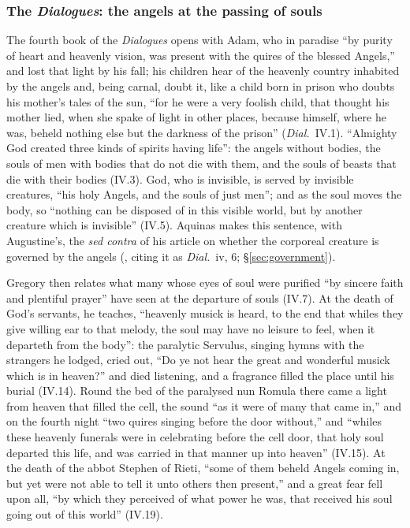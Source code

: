 \subsubsection{The \emph{Dialogues}: the angels at the passing of souls}

The fourth book of the \emph{Dialogues} opens with Adam, who in paradise ``by
purity of heart and heavenly vision, was present with the quires of the
blessed Angels,'' and lost that light by his fall; his children hear of the
heavenly country inhabited by the angels and, being carnal, doubt it, like a
child born in prison who doubts his mother's tales of the sun, ``for he were
a very foolish child, that thought his mother lied, when she spake of light in
other places, because himself, where he was, beheld nothing else but the
darkness of the prison'' (\emph{Dial.}\ IV.1). ``Almighty God
created three kinds of spirits having life'': the angels without bodies, the
souls of men with bodies that do not die with them, and the souls of beasts
that die with their bodies (IV.3). God, who is invisible, is served by
invisible creatures, ``his holy Angels, and the souls of just men''; and as
the soul moves the body, so ``nothing can be disposed of in this visible
world, but by another creature which is invisible'' (IV.5). Aquinas makes
this sentence, with Augustine's, the \emph{sed contra} of his article on
whether the corporeal creature is governed by the angels (,
citing it as \emph{Dial.}\ iv, 6; \S\ref{sec:government}).

Gregory then relates what many whose eyes of soul were purified ``by sincere
faith and plentiful prayer'' have seen at the departure of souls (IV.7). At
the death of God's servants, he teaches, ``heavenly musick is heard, to the
end that whiles they give willing ear to that melody, the soul may have no
leisure to feel, when it departeth from the body'': the paralytic Servulus,
singing hymns with the strangers he lodged, cried out, ``Do ye not hear the
great and wonderful musick which is in heaven?'' and died listening, and a
fragrance filled the place until his burial (IV.14). Round the bed of the
paralysed nun Romula there came a light from heaven that filled the cell,
the sound ``as it were of many that came in,'' and on the fourth night
``two quires singing before the door without,'' and ``whiles these heavenly
funerals were in celebrating before the cell door, that holy soul departed
this life, and was carried in that manner up into heaven'' (IV.15). At the
death of the abbot Stephen of Rieti, ``some of them beheld Angels coming in,
but yet were not able to tell it unto others then present,'' and a great
fear fell upon all, ``by which they perceived of what power he was, that
received his soul going out of this world'' (IV.19).

